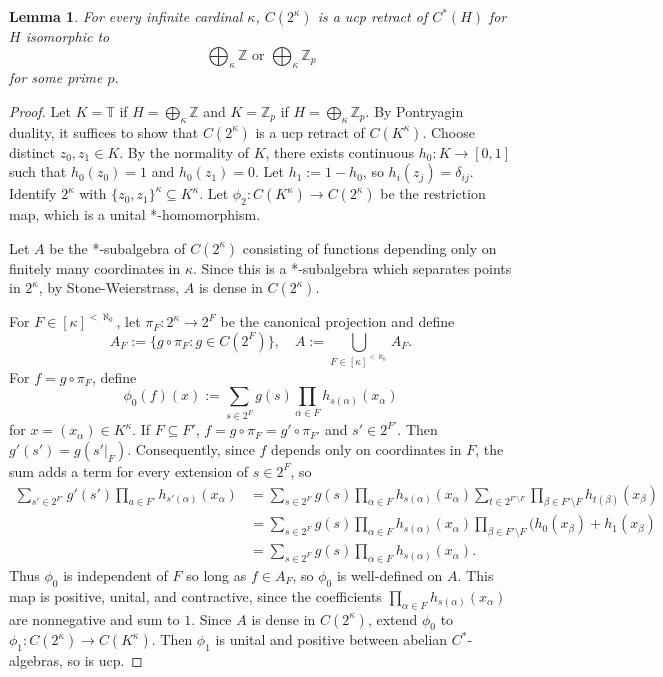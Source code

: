 \documentclass[10pt]{amsart}
\newtheorem{lem}[thm]{Lemma}
\theoremstyle{definition}
\begin{document}
\begin{lem}\label{Zto2}
    For every infinite cardinal $\kappa$, $C(2^\kappa)$ is a ucp retract of $C^*(H)$ for $H$ isomorphic to
    \[\bigoplus_{\kappa}\mathbb{Z}\text{ or }\bigoplus_{\kappa}\mathbb{Z}_p\]
    for some prime $p$.
\end{lem}

\begin{proof}
    Let $K=\mathbb{T}$ if $H=\bigoplus_\kappa\mathbb{Z}$ and $K=\mathbb{Z}_p$ if $H=\bigoplus_{\kappa}\mathbb{Z}_p$. By Pontryagin duality, it suffices to show that $C(2^\kappa)$ is a ucp retract of $C(K^\kappa)$. Choose distinct $z_0,z_1\in K$. By the normality of $K$, there exists continuous $h_0:K\rightarrow[0,1]$ such that $h_0(z_0)=1$ and $h_0(z_1)=0$. Let $h_1:=1-h_0$, so $h_i(z_j)=\delta_{ij}$. Identify $2^\kappa$ with $\{z_0,z_1\}^\kappa\subseteq K^\kappa$. Let $\phi_2:C(K^\kappa)\rightarrow C(2^\kappa)$ be the restriction map, which is a unital *-homomorphism.

    Let $A$ be the *-subalgebra of $C(2^\kappa)$ consisting of functions depending only on finitely many coordinates in $\kappa$. Since this is a *-subalgebra which separates points in $2^\kappa$, by Stone-Weierstrass, $A$ is dense in $C(2^\kappa)$. 
    
    
    For $F\in[\kappa]^{<\aleph_0}$, let $\pi_F:2^\kappa\rightarrow 2^F$ be the canonical projection and define
    \[A_F:=\{g\circ\pi_F:g\in C(2^F)\},\quad A:=\bigcup_{F\in [\kappa]^{<\aleph_0}}A_F.\]
    For $f=g\circ\pi_F$, define 
    \[\phi_0(f)(x):=\sum_{s\in 2^F}g(s)\prod_{\alpha\in F}h_{s(\alpha)}(x_\alpha)\]
    for $x=(x_\alpha)\in K^\kappa$. If $F\subseteq F'$, $f=g\circ \pi_F=g'\circ\pi_{F'}$ and $s'\in 2^{F'}$. Then $g'(s')=g(s'|_F)$. Consequently, since $f$ depends only on coordinates in $F$, the sum adds a term for every extension of $s\in 2^F$, so
    \begin{align*}
        \sum_{s'\in 2^{F'}}g'(s')\prod_{a\in F'}h_{s'(\alpha)}(x_\alpha) &= \sum_{s\in 2^F}g(s)\prod_{\alpha\in F}h_{s(\alpha)}(x_\alpha) \sum_{t\in 2^{F'\setminus F}}\prod_{\beta\in F'\setminus F}h_{t(\beta)}(x_\beta) \\
        &= \sum_{s\in 2^F}g(s)\prod_{\alpha\in F}h_{s(\alpha)}(x_\alpha)\prod_{\beta\in F'\setminus F}(h_0(x_\beta)+h_1(x_\beta) \\
        &= \sum_{s\in 2^F}g(s)\prod_{\alpha\in F}h_{s(\alpha)}(x_\alpha).
    \end{align*}
    Thus $\phi_0$ is independent of $F$ so long as $f\in A_F$, so $\phi_0$ is well-defined on $A$. This map is positive, unital, and contractive, since the coefficients $\prod_{\alpha\in F}h_{s(\alpha)}(x_\alpha)$ are nonnegative and sum to $1$. Since $A$ is dense in $C(2^\kappa)$, extend $\phi_0$ to $\phi_1:C(2^\kappa)\rightarrow C(K^\kappa)$. Then $\phi_1$ is unital and positive between abelian $C^*$-algebras, so is ucp.


\end{proof}
\end{document}
